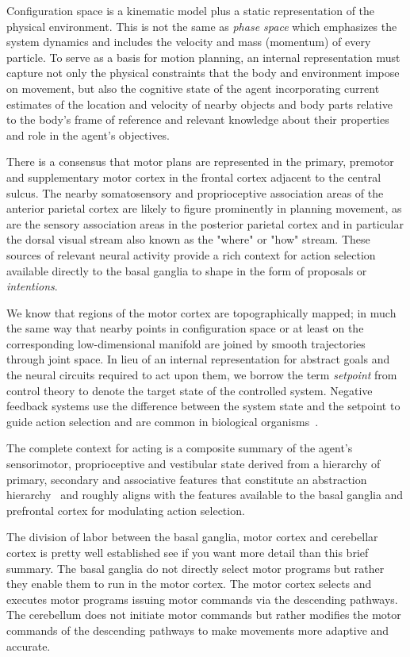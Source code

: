 Configuration space is a kinematic model plus a static representation of the physical environment. This is not the same as {\it{phase space}} which emphasizes the system dynamics and includes the velocity and mass (momentum) of every particle. To serve as a basis for motion planning, an internal representation must capture not only the physical constraints that the body and environment impose on movement, but also the cognitive state of the agent incorporating current estimates of the location and velocity of nearby objects and body parts relative to the body's frame of reference and relevant knowledge about their properties and role in the agent's objectives.

There is a consensus that motor plans are represented in the primary, premotor and supplementary motor cortex in the frontal cortex adjacent to the central sulcus. The nearby somatosensory and proprioceptive association areas of the anterior parietal cortex are likely to figure prominently in planning movement, as are the sensory association areas in the posterior parietal cortex and in particular the dorsal visual stream also known as the "where" or "how" stream. These sources of relevant neural activity provide a rich context for action selection available directly to the basal ganglia to shape in the form of proposals or {\it{intentions}}.

We know that regions of the motor cortex are topographically mapped; in much the same way that nearby points in configuration space {\emdash{}} or at least on the corresponding low-dimensional manifold {\emdash{}} are joined by smooth trajectories through joint space. In lieu of an internal representation for abstract goals and the neural circuits required to act upon them, we borrow the term {\it{setpoint}} from control theory to denote the target state of the controlled system. Negative feedback systems use the difference between the system state and the setpoint to guide action selection and are common in biological organisms~\cite{Ashby1957cybernetics}.

The complete context for acting is a composite summary of the agent's sensorimotor, proprioceptive and vestibular state derived from a hierarchy of primary, secondary and associative features that constitute an abstraction hierarchy~\cite{FusterPREFRONTAL-CORTEX-15-CHAPTER_8} and roughly aligns with the features available to the basal ganglia and prefrontal cortex for modulating action selection.

The division of labor between the basal ganglia, motor cortex and cerebellar cortex is pretty well established {\emdash{}} see {} if you want more detail than this brief summary. The basal ganglia do not directly select motor programs but rather they enable them to run in the motor cortex. The motor cortex selects and executes motor programs issuing motor commands via the descending pathways. The cerebellum does not initiate motor commands but rather modifies the motor commands of the descending pathways to make movements more adaptive and accurate. 

